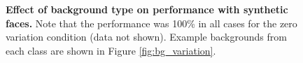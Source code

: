 \begin{figure}[ht]
{  \label{fig:bg_var4}
}

\caption[]{{\bf Effect of background type on performance with synthetic faces.} Note that the performance was 100\% in all cases for the zero variation condition (data not shown).  Example backgrounds from each class are shown in Figure \ref{fig:bg_variation}. }
\label{fig:perf_bg_variation}
\end{figure}



